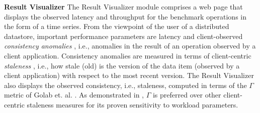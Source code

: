 \documentclass[conference]{IEEEtran}
\begin{document}

\par \textbf{Result Visualizer}
The Result Visualizer module comprises a web page that displays the observed latency and throughput for the benchmark operations in the form of a time series.
 From the viewpoint of the user of a distributed datastore, important performance parameters are  latency and client-observed \emph{consistency
anomalies} \cite{Terry:2013:CSL:2517349.2522731}, i.e., anomalies in the result of an operation observed by a client application.  Consistency anomalies are measured in terms of  client-centric \emph{staleness}
  \cite{Terry:2013:CSL:2517349.2522731}, %
   i.e., how stale (old) is the version of
 the data item (observed by a client application) with respect to the most recent version.
    The Result Visualizer also displays the observed consistency, i.e., staleness, computed in terms of the {\boldmath$\Gamma$} metric of Golab et. al. \cite{DBLP:conf/cloud/GolabRAKWG13}. As demonstrated in \cite{DBLP:conf/cloud/GolabRAKWG13}, {\boldmath$\Gamma$}  is preferred over other client-centric staleness measures for its proven sensitivity to workload parameters.
\end{document}
